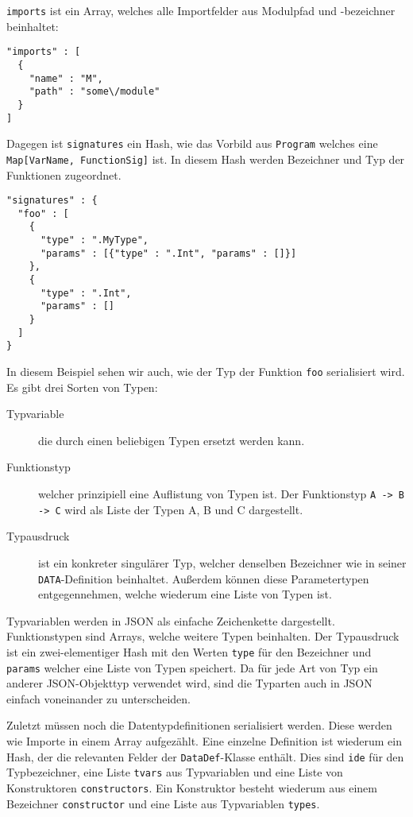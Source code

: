 \documentclass[runningheads]{llncs}
\begin{document}
\verb|imports| ist ein Array, welches alle Importfelder aus Modulpfad und -bezeichner beinhaltet:

\begin{verbatim}
"imports" : [
  {
    "name" : "M",
    "path" : "some\/module"
  }
]
\end{verbatim}

Dagegen ist \verb|signatures| ein Hash, wie das Vorbild aus \verb|Program| welches eine \verb|Map[VarName, FunctionSig]| ist. In diesem Hash werden Bezeichner und Typ der Funktionen zugeordnet.

\begin{verbatim}
"signatures" : {
  "foo" : [
    {
      "type" : ".MyType",
      "params" : [{"type" : ".Int", "params" : []}]
    },
    {
      "type" : ".Int",
      "params" : []
    }
  ]
}
\end{verbatim}

In diesem Beispiel sehen wir auch, wie der Typ der Funktion \verb|foo| serialisiert wird. Es gibt drei Sorten von Typen:

\begin{description}
 \item[Typvariable] die durch einen beliebigen Typen ersetzt werden kann.
 \item[Funktionstyp] welcher prinzipiell eine Auflistung von Typen ist. Der Funktionstyp \verb|A -> B -> C| wird als Liste der Typen A, B und C dargestellt.
 \item[Typausdruck] ist ein konkreter singulärer Typ, welcher denselben Bezeichner wie in seiner \verb|DATA|-Definition beinhaltet. Außerdem können diese Parametertypen entgegennehmen, welche wiederum eine Liste von Typen ist.
\end{description}

Typvariablen werden in JSON als einfache Zeichenkette dargestellt. Funktionstypen sind Arrays, welche weitere Typen beinhalten. Der Typausdruck ist ein zwei-elementiger Hash mit den Werten \verb|type| für den Bezeichner und \verb|params| welcher eine Liste von Typen speichert. Da für jede Art von Typ ein anderer JSON-Objekttyp verwendet wird, sind die Typarten auch in JSON einfach voneinander zu unterscheiden.

Zuletzt müssen noch die Datentypdefinitionen serialisiert werden. Diese werden wie Importe in einem Array aufgezählt. Eine einzelne Definition ist wiederum ein Hash, der die relevanten Felder der \verb|DataDef|-Klasse enthält. Dies sind \verb|ide| für den Typbezeichner, eine Liste \verb|tvars| aus Typvariablen und eine Liste von Konstruktoren \verb|constructors|. Ein Konstruktor besteht wiederum aus einem Bezeichner \verb|constructor| und eine Liste aus Typvariablen \verb|types|.
\end{document}
